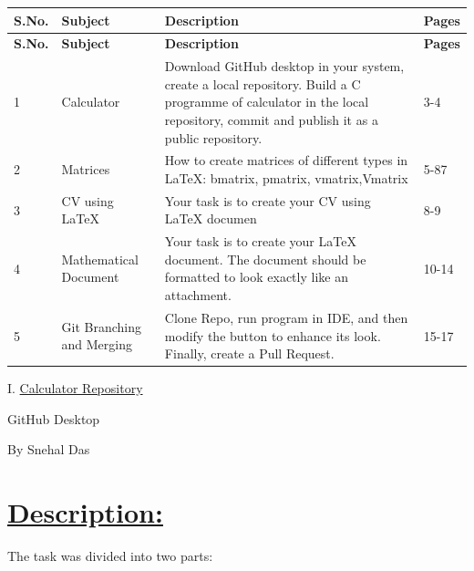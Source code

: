 \documentclass{article}
\begin{document}
\begin{center}
    
\large \begin{longtable}{|p{}|p{}|p{}|p{}|}
    \hline
    \textbf{\Large S.No.} & \textbf{\Large Subject} & \textbf{\Large Description} & \textbf{\Large Pages} \\
    \hline
    \endfirsthead
    \hline
    \textbf{\Large S.No.} & \textbf{\Large Subject} & \textbf{\Large Description} & \textbf{\Large Pages} \\
    \hline
    \endhead
    \hline
    1 & Calculator & Download GitHub desktop in your system, create a local repository. Build a C programme of calculator in the local repository, commit and publish it as a public repository. & 3-4 \\
    \hline
    2 & Matrices & How to create matrices of different types in LaTeX: bmatrix, pmatrix, vmatrix,Vmatrix & 5-87\\
    \hline
    3 & CV using LaTeX & Your task is to create your CV using LaTeX documen & 8-9 \\
    \hline
    4 & Mathematical Document & Your task is to create your LaTeX document. The document should be formatted to look exactly like an attachment. & 10-14 \\
    \hline
    5 & Git Branching and Merging & Clone Repo, run program in IDE, and
then modify the button to enhance its look. Finally, create a Pull Request. & 15-17 \\
    \hline
    
    
\end{longtable}
\end{center}
\newpage

\begin{center}
    \Huge I. \underline{Calculator Repository}
    \end{center}
    \vspace{1em}

    \begin{center}
        \Large GitHub Desktop
    \end{center}

    \vspace{0.4em}
    
    \begin{center}
        \large By Snehal Das
    \end{center}


\section{\underline{Description:}}
The task was divided into two parts: \vspace{0.2cm}\newline
\end{document}
